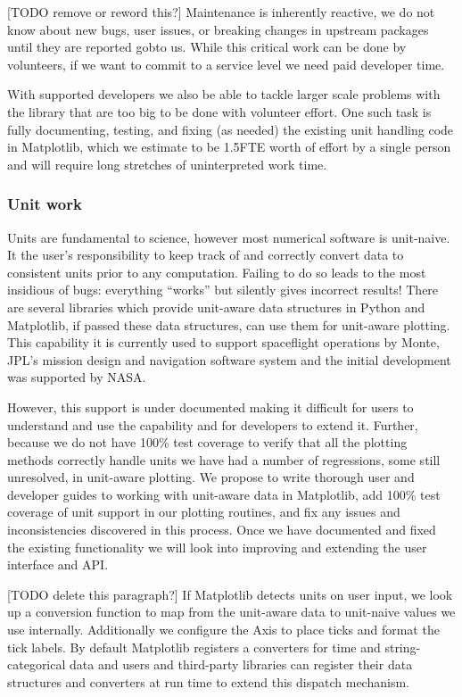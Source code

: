 \documentclass[12pt]{article}
\numberwithin{page}{section}
\begin{document}
[TODO remove or reword this?] Maintenance is inherently reactive, we
do not know about new bugs, user issues, or breaking changes in
upstream packages until they are reported gobto us.  While this critical
work can be done by volunteers, if we want to commit to a service
level we need paid developer time.

With supported developers we also be able to tackle larger scale
problems with the library that are too big to be done with volunteer
effort.  One such task is fully documenting, testing, and fixing (as
needed) the existing unit handling code in Matplotlib, which we
estimate to be 1.5FTE worth of effort by a single person and will
require long stretches of uninterpreted work time.


\subsubsection{Unit work}

Units are fundamental to science, however most numerical software is
unit-naive.  It the user's responsibility to keep track of and
correctly convert data to consistent units prior to any computation.
Failing to do so leads to the most insidious of bugs: everything
``works'' but silently gives incorrect results!  There are several
libraries which provide unit-aware data structures in Python and
Matplotlib, if passed these data structures, can use them for
unit-aware plotting.  This capability it is currently used to support
spaceflight operations by Monte, JPL's mission design and navigation
software system and the initial development was supported by NASA.

However, this support is under documented making it difficult for
users to understand and use the capability and for developers to
extend it.  Further, because we do not have 100\% test coverage to
verify that all the plotting methods correctly handle units we have
had a number of regressions, some still unresolved, in unit-aware
plotting.  We propose to write thorough user and developer guides to
working with unit-aware data in Matplotlib, add 100\% test coverage of
unit support in our plotting routines, and fix any issues and
inconsistencies discovered in this process.  Once we have documented
and fixed the existing functionality we will look into improving and
extending the user interface and API.

[TODO delete this paragraph?]  If Matplotlib detects units on user
input, we look up a conversion function to map from the unit-aware
data to unit-naive values we use internally.  Additionally we
configure the Axis to place ticks and format the tick labels.  By
default Matplotlib registers a converters for time and
string-categorical data and users and third-party libraries can
register their data structures and converters at run time to extend
this dispatch mechanism.
\end{document}
